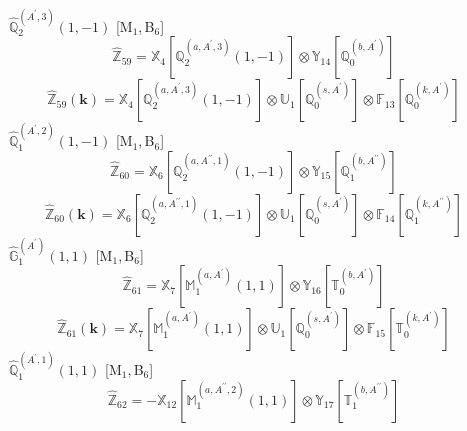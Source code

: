 \documentclass[fleqn,10pt,landscape]{article}
\begin{document}
\begin{itemize}
\begin{dmath*}
\end{dmath*}
\vspace{4mm}
\noindent {} $\,\,\,\hat{\mathbb{Q}}_{2}^{(A^{\prime},3)}(1,-1)$ [M$_{1}$,\,B$_{6}$]
\begin{dmath*}
\hat{\mathbb{Z}}_{59}=\mathbb{X}_{4}[\mathbb{Q}_{2}^{(a,A^{\prime},3)}(1,-1)] \otimes\mathbb{Y}_{14}[\mathbb{Q}_{0}^{(b,A^{\prime})}]
\end{dmath*}
\begin{dmath*}
\hat{\mathbb{Z}}_{59}(\bm{k})=\mathbb{X}_{4}[\mathbb{Q}_{2}^{(a,A^{\prime},3)}(1,-1)] \otimes\mathbb{U}_{1}[\mathbb{Q}_{0}^{(s,A^{\prime})}] \otimes\mathbb{F}_{13}[\mathbb{Q}_{0}^{(k,A^{\prime})}]
\end{dmath*}
\vspace{4mm}
\noindent {} $\,\,\,\hat{\mathbb{Q}}_{1}^{(A^{\prime},2)}(1,-1)$ [M$_{1}$,\,B$_{6}$]
\begin{dmath*}
\hat{\mathbb{Z}}_{60}=\mathbb{X}_{6}[\mathbb{Q}_{2}^{(a,A^{\prime\prime},1)}(1,-1)] \otimes\mathbb{Y}_{15}[\mathbb{Q}_{1}^{(b,A^{\prime\prime})}]
\end{dmath*}
\begin{dmath*}
\hat{\mathbb{Z}}_{60}(\bm{k})=\mathbb{X}_{6}[\mathbb{Q}_{2}^{(a,A^{\prime\prime},1)}(1,-1)] \otimes\mathbb{U}_{1}[\mathbb{Q}_{0}^{(s,A^{\prime})}] \otimes\mathbb{F}_{14}[\mathbb{Q}_{1}^{(k,A^{\prime\prime})}]
\end{dmath*}
\vspace{4mm}
\noindent {} $\,\,\,\hat{\mathbb{G}}_{1}^{(A^{\prime})}(1,1)$ [M$_{1}$,\,B$_{6}$]
\begin{dmath*}
\hat{\mathbb{Z}}_{61}=\mathbb{X}_{7}[\mathbb{M}_{1}^{(a,A^{\prime})}(1,1)] \otimes\mathbb{Y}_{16}[\mathbb{T}_{0}^{(b,A^{\prime})}]
\end{dmath*}
\begin{dmath*}
\hat{\mathbb{Z}}_{61}(\bm{k})=\mathbb{X}_{7}[\mathbb{M}_{1}^{(a,A^{\prime})}(1,1)] \otimes\mathbb{U}_{1}[\mathbb{Q}_{0}^{(s,A^{\prime})}] \otimes\mathbb{F}_{15}[\mathbb{T}_{0}^{(k,A^{\prime})}]
\end{dmath*}
\vspace{4mm}
\noindent {} $\,\,\,\hat{\mathbb{Q}}_{1}^{(A^{\prime},1)}(1,1)$ [M$_{1}$,\,B$_{6}$]
\begin{dmath*}
\hat{\mathbb{Z}}_{62}=- \mathbb{X}_{12}[\mathbb{M}_{1}^{(a,A^{\prime\prime},2)}(1,1)] \otimes\mathbb{Y}_{17}[\mathbb{T}_{1}^{(b,A^{\prime\prime})}]
\end{dmath*}
\begin{dmath*}

\end{dmath*}
\end{itemize}
\end{document}
